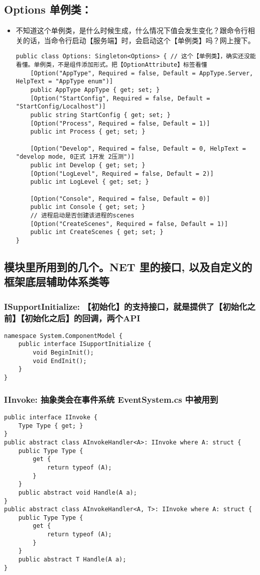 \documentclass[9pt, b5paper]{article}
\begin{document}
\subsection{Options 单例类：}
\label{sec-2-2}
\begin{itemize}
\item 不知道这个单例类，是什么时候生成，什么情况下值会发生变化？跟命令行相关的话，当命令行启动【服务端】时，会启动这个【单例类】吗？网上搜下。
\begin{verbatim}
public class Options: Singleton<Options> { // 这个【单例类】，确实还没能看懂。单例类，不是组件添加形式。把【OptionAttribute】标签看懂
    [Option("AppType", Required = false, Default = AppType.Server, HelpText = "AppType enum")]
    public AppType AppType { get; set; }
    [Option("StartConfig", Required = false, Default = "StartConfig/Localhost")]
    public string StartConfig { get; set; }
    [Option("Process", Required = false, Default = 1)]
    public int Process { get; set; }

    [Option("Develop", Required = false, Default = 0, HelpText = "develop mode, 0正式 1开发 2压测")]
    public int Develop { get; set; }
    [Option("LogLevel", Required = false, Default = 2)]
    public int LogLevel { get; set; }

    [Option("Console", Required = false, Default = 0)]
    public int Console { get; set; }
    // 进程启动是否创建该进程的scenes
    [Option("CreateScenes", Required = false, Default = 1)]
    public int CreateScenes { get; set; }
}
\end{verbatim}
\end{itemize}

\subsection{模块里所用到的几个。NET 里的接口, 以及自定义的框架底层辅助体系类等}
\label{sec-2-3}
\subsubsection{ISupportInitialize: 【初始化】的支持接口，就是提供了【初始化之前】【初始化之后】的回调，两个API}
\label{sec-2-3-1}
\begin{verbatim}
namespace System.ComponentModel {
    public interface ISupportInitialize {
        void BeginInit();
        void EndInit();
    }
}
\end{verbatim}
\subsubsection{IInvoke: 抽象类会在事件系统 EventSystem.cs 中被用到}
\label{sec-2-3-2}
\begin{verbatim}
public interface IInvoke {
    Type Type { get; }
}
public abstract class AInvokeHandler<A>: IInvoke where A: struct {
    public Type Type {
        get {
            return typeof (A);
        }
    }
    public abstract void Handle(A a);
}
public abstract class AInvokeHandler<A, T>: IInvoke where A: struct {
    public Type Type {
        get {
            return typeof (A);
        }
    }
    public abstract T Handle(A a);
}
\end{verbatim}
\end{document}
